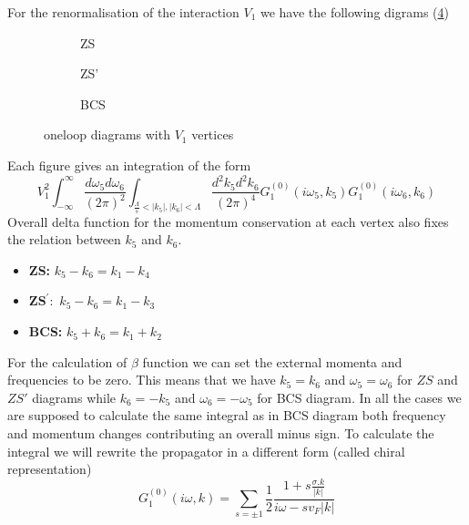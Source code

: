 \documentclass[a4paper,crop=false]{standalone}
\begin{document}
        For the renormalisation of the interaction $V_1$ we have the following digrams (\ref{fig:oneloopfromV1})
        \begin{figure}[h]
            \centering
            \begin{subfigure}[t]{0.3\textwidth}
                
            \caption{ZS}
            \label{fig:ZSfromV1}
            \end{subfigure}
            \begin{subfigure}[t]{0.3\textwidth}
                
            \caption{ZS'}
            \label{fig:ZSprimefromV1}
            \end{subfigure}
            \begin{subfigure}[t]{0.3\textwidth}
                
            \caption{BCS}
            \label{fig:BCSfromV1}
            \end{subfigure}
            \caption{oneloop diagrams with $V_1$ vertices}
            \label{fig:oneloopfromV1}
        \end{figure}

        Each figure gives an integration of the form
        \begin{equation}\label{eqn:oneloopfour}
            V^2_1\int^{\infty}_{-\infty}\frac{d\omega_5d\omega_6}{(2\pi)^2}\int_{\frac{\Lambda}{s}<|k_5|,|k_6|<\Lambda}\frac{d^2k_5d^2k_6}{(2\pi)^4} G^{(0)}_1(i\omega_5,k_5)G^{(0)}_1(i\omega_6,k_6)
        \end{equation}
        Overall delta function for the momentum conservation at each vertex also fixes the relation between $k_5$ and $k_6$.
        \begin{itemize}
            \item \textbf{ZS: } $k_5 - k_6 = k_1 - k_4$
            \item $\mathbf{ZS^{\prime}: }$ $k_5 - k_6 = k_1 - k_3$
            \item \textbf{BCS: } $k_5 + k_6 = k_1 + k_2$
        \end{itemize}
        For the calculation of $\beta$ function we can set the external momenta and frequencies to be zero. This means that we have $k_5 = k_6$ and $\omega_5 = \omega_6$ for $ZS$ and $ZS'$ diagrams while $k_6 = -k_5$ and $\omega_6 = -\omega_5$ for BCS diagram. In all the cases we are supposed to calculate the same integral as in BCS diagram both frequency and momentum changes contributing an overall minus sign. To calculate the integral we will rewrite the propagator in a different form (called chiral representation)
        \begin{equation}
            G^{(0)}_{1}(i\omega,k) = \sum_{s=\pm 1}\frac{1}{2}\frac{1+s\frac{\sigma . k}{|k|}}{i\omega - sv_F|k|}
        \end{equation}
\end{document}

